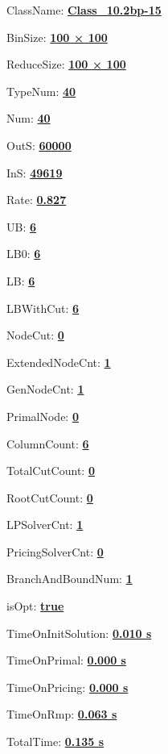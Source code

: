 \documentclass[11pt]{article}
\begin{document}
\pagestyle{empty}


ClassName: \underline{\textbf{Class_10.2bp-15}}
\par
BinSize: \underline{\textbf{100 × 100}}
\par
ReduceSize: \underline{\textbf{100 × 100}}
\par
TypeNum: \underline{\textbf{40}}
\par
Num: \underline{\textbf{40}}
\par
OutS: \underline{\textbf{60000}}
\par
InS: \underline{\textbf{49619}}
\par
Rate: \underline{\textbf{0.827}}
\par
UB: \underline{\textbf{6}}
\par
LB0: \underline{\textbf{6}}
\par
LB: \underline{\textbf{6}}
\par
LBWithCut: \underline{\textbf{6}}
\par
NodeCut: \underline{\textbf{0}}
\par
ExtendedNodeCnt: \underline{\textbf{1}}
\par
GenNodeCnt: \underline{\textbf{1}}
\par
PrimalNode: \underline{\textbf{0}}
\par
ColumnCount: \underline{\textbf{6}}
\par
TotalCutCount: \underline{\textbf{0}}
\par
RootCutCount: \underline{\textbf{0}}
\par
LPSolverCnt: \underline{\textbf{1}}
\par
PricingSolverCnt: \underline{\textbf{0}}
\par
BranchAndBoundNum: \underline{\textbf{1}}
\par
isOpt: \underline{\textbf{true}}
\par
TimeOnInitSolution: \underline{\textbf{0.010 s}}
\par
TimeOnPrimal: \underline{\textbf{0.000 s}}
\par
TimeOnPricing: \underline{\textbf{0.000 s}}
\par
TimeOnRmp: \underline{\textbf{0.063 s}}
\par
TotalTime: \underline{\textbf{0.135 s}}
\par
\newpage


\end{document}
